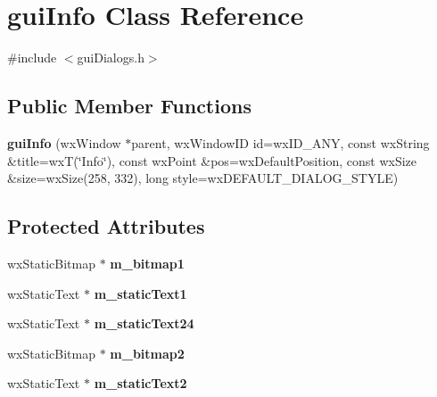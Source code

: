 \hypertarget{classgui_info}{
\section{guiInfo Class Reference}
\label{classgui_info}
}


{\ttfamily \#include $<$guiDialogs.h$>$}\subsection*{Public Member Functions}
\begin{DoxyCompactItemize}
\item 
\hypertarget{classgui_info_ab60c19614fcad85f7eb40fd13f02ab10}{
{\bfseries guiInfo} (wxWindow $\ast$parent, wxWindowID id=wxID\_\-ANY, const wxString \&title=wxT(\char`\"{}Info\char`\"{}), const wxPoint \&pos=wxDefaultPosition, const wxSize \&size=wxSize(258, 332), long style=wxDEFAULT\_\-DIALOG\_\-STYLE)}
\label{classgui_info_ab60c19614fcad85f7eb40fd13f02ab10}

\end{DoxyCompactItemize}
\subsection*{Protected Attributes}
\begin{DoxyCompactItemize}
\item 
\hypertarget{classgui_info_aa449b64906528e446e1c1fe85bfee9e2}{
wxStaticBitmap $\ast$ {\bfseries m\_\-bitmap1}}
\label{classgui_info_aa449b64906528e446e1c1fe85bfee9e2}

\item 
\hypertarget{classgui_info_a510487f250d43c475988cecb6fb47343}{
wxStaticText $\ast$ {\bfseries m\_\-staticText1}}
\label{classgui_info_a510487f250d43c475988cecb6fb47343}

\item 
\hypertarget{classgui_info_a0d0fc0c65431b370dde60a1bf93f5e39}{
wxStaticText $\ast$ {\bfseries m\_\-staticText24}}
\label{classgui_info_a0d0fc0c65431b370dde60a1bf93f5e39}

\item 
\hypertarget{classgui_info_a687cec1c9762c6cb54f4cebffe31ff03}{
wxStaticBitmap $\ast$ {\bfseries m\_\-bitmap2}}
\label{classgui_info_a687cec1c9762c6cb54f4cebffe31ff03}

\item 
\hypertarget{classgui_info_a659324950e3de5cf72a92e7d659fd762}{
wxStaticText $\ast$ {\bfseries m\_\-staticText2}}
\label{classgui_info_a659324950e3de5cf72a92e7d659fd762}

\end{DoxyCompactItemize}



